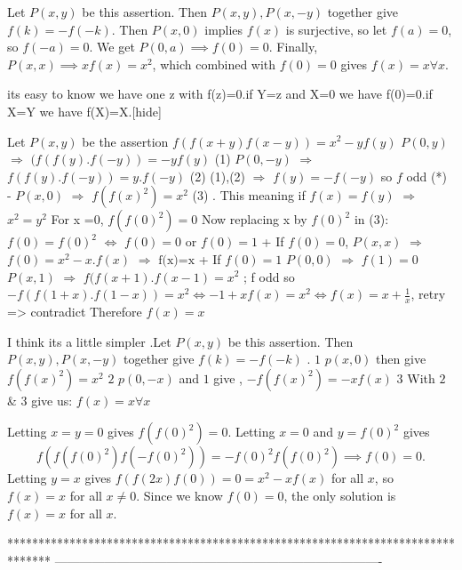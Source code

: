 \begin{solution}
	Let $P(x, y)$ be this assertion. Then $P(x, y), P(x, -y)$ together give $f(k)=-f(-k)$. Then $P(x, 0)$ implies $f(x)$ is surjective, so let $f(a)=0$, so $f(-a)=0$. We get $P(0, a)\implies f(0)=0$. Finally, $P(x, x)\implies xf(x)=x^2$, which combined with $f(0)=0$ gives $\boxed{f(x)=x\forall x}$.
\end{solution}



\begin{solution}its easy to know we have one z with f(z)=0.if Y=z and X=0 we have f(0)=0.if X=Y we have f(X)=X.[\/hide]
\end{solution}



\begin{solution}
	Let $P(x,y)$ be the assertion $f(f(x+y)f(x-y))=x^2-yf(y)$
$P(0,y)$ $\Rightarrow $ $(f(f(y).f(-y))= -yf(y)$ (1)
$P(0,-y)$ $\Rightarrow $ $f(f(y).f(-y))=y.f(-y)$ (2)
(1),(2) $\Rightarrow $ $f(y)=-f(-y)$ so $f$ odd (*)
- $P(x,0)$ $\Rightarrow $ $f(f(x)^2)=x^2$ (3) . This meaning if $f(x)=f(y)$ $\Rightarrow$  $x^2=y^2$
For x =0, $f(f(0)^2)=0$
Now replacing x by $f(0)^2$ in (3):$ f(0)=f(0)^2$ $\Leftrightarrow $ $f(0)=0$ or $f(0)=1$
+ If $f(0)=0$,  $P(x,x)$  $\Rightarrow $ $f(0)=x^2-x.f(x)$  $\Rightarrow $ $\boxed{\text{f(x)=x}}$
+ If $f(0)=1$
$P(0,0)$ $\Rightarrow $ $f(1)=0$
$P(x,1)$ $\Rightarrow $  $f(f(x+1).f(x-1)=x^2$ ; f odd so $-f(f(1+x).f(1-x))=x^2 \Leftrightarrow -1+xf(x)=x^2 \Leftrightarrow  f(x)=x+\frac{1}{x}$, retry => contradict
Therefore $f(x)=x$
\end{solution}



\begin{solution}
	I think its a little simpler .Let $P(x, y)$ be this assertion. Then $P(x, y), P(x, -y)$ together give $f(k)=-f(-k)$ . $\boxed{1}$ $p(x,0)$ then give $f(f(x)^2)=x^2$ $\boxed{2}$ $p(0,-x)$ and $\boxed{1}$ give , $-f(f(x)^2)=-xf(x)$ $\boxed{3}$ With $2$ & $3$ give us: $\boxed{f(x)=x\forall x}$
\end{solution}



\begin{solution}
	Letting $x=y=0$ gives $f(f(0)^2) = 0$. Letting $x=0$ and $y=f(0)^2$ gives \[f\left(f\left(f(0)^2\right)f\left(-f(0)^2\right)\right) = -f(0)^2f\left(f(0)^2\right) \implies f(0) = 0.\] Letting $y=x$ gives $f(f(2x)f(0)) = 0 = x^2 - xf(x)$ for all $x$, so $f(x) = x$ for all $x \neq 0$. Since we know $f(0)=0$, the only solution is $f(x) = x$ for all $x$.
\end{solution}
*******************************************************************************
-------------------------------------------------------------------------------

